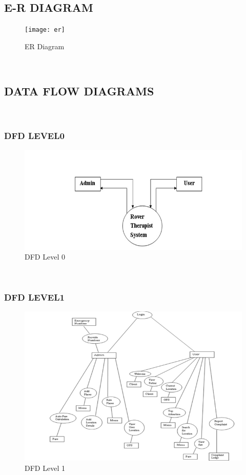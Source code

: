 \documentclass[12pt,a4paper]{article}
\begin{document}
\subsection{E-R DIAGRAM}
\begin{figure}[!htb]
\centering
\texttt{[image: er]}
\caption{ER Diagram}
\end{figure}
\\
\newpage
\subsection{DATA FLOW DIAGRAMS}
\\
\subsubsection{DFD LEVEL0}
\begin{figure}[!htb]
\centering
\includegraphics[width=15 cm]{level}
\caption{DFD Level 0}
\end{figure}
\\
\newpage
\subsubsection{DFD LEVEL1}
\begin{figure}[!htb]
\centering
\includegraphics[width=15 cm]{levell}
\caption{DFD Level 1}
\end{figure}
\\
\newpage
\end{document}
